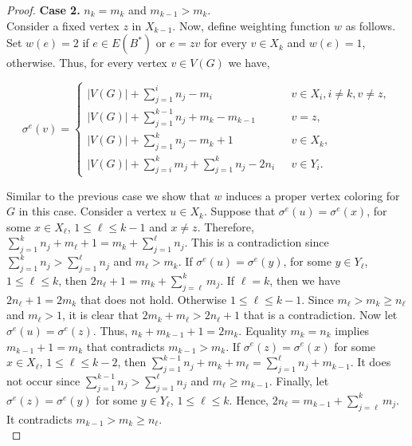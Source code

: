 \documentclass[12pt,a4paper]{article}
\begin{document}
\begin{proof}
	\textbf{Case 2.} $n_k = m_k$ and $m_{k-1}>m_k.$\\
	Consider a fixed vertex $z$ in $X_{k-1}$.  Now, define weighting function $w$ as follows. Set $w(e)=2$ if $e\in E(B^*)$ or $e=zv$ for every $v\in X_k$ and $w(e)=1$, otherwise. Thus, for every vertex $ v\in V(G) $ we have,
	\begin{center}
		\begin{equation}\label{1}
		\sigma^{e}(v)=
		\left\{
		\begin{array}{ll}
		|V(G)|+\sum _{j=1}^i n_j-m_i & \ \ \ v\in X_i, i\neq k, v\neq z,  \\
		|V(G)|+\sum _{j=1}^{k-1} n_j +m_{k}-m_{k-1} & \ \ \ v=z,\\
		|V(G)|+\sum _{j=1}^{k} n_j -m_{k}+1 & \ \ \ v\in X_k, \\
		|V(G)|+\sum _{j=i}^k m_j + \sum_{j=1}^k n_j-2n_i & \ \ \ v\in Y_i.
		\end{array}
		\right.
		\end{equation}
	\end{center}
	Similar to the previous case we show that $w$ induces a proper vertex coloring for $G$ in this case. Consider a vertex $u \in X_k$. Suppose that $\sigma^{e}(u)=\sigma^{e}(x)$, for some  $x\in X_{\ell}$, $1\leq \ell \leq k-1 $ and $x \neq z$. Therefore, $\sum _{j=1}^{k} n_j + m_{\ell}+1=m_k +\sum _{j=1}^{\ell} n_j$. This is a contradiction since $\sum _{j=1}^{k} n_j >\sum _{j=1}^{\ell} n_j$ and $m_{\ell} > m_k$.
	If $\sigma^{e}(u)=\sigma^{e}(y)$, for some  $y \in Y_{\ell}$, $1\leq \ell \leq k $, then $2n_{\ell}+1=m_k + \sum _{j=\ell}^k m_j.$
	If $\ell =k$, then  we have $2n_{\ell}+1=2m_k$ that does not hold. Otherwise $1\leq \ell \leq k-1$. Since $m_{\ell}> m_k \geq n_{\ell}$ and $m_{\ell} >1$,  it is clear that $2m_k +m_{\ell} >2n_{\ell}+1$ that is a contradiction.
	Now let $\sigma^{e}(u)=\sigma^{e}(z)$. Thus, $n_k +m_{k-1}+1=2m_{k}.$
	Equality $m_k=n_k$ implies $m_{k-1}+1=m_{k}$ that contradicts  $m_{k-1}> m_{k}$.
	If $\sigma^{e}(z)=\sigma^{e}(x)$ for some  $x\in X_{\ell}$, $1\leq \ell \leq k-2 $, then
	$\sum _{j=1}^{k-1} n_j +m_k+m_{\ell}=\sum _{j=1}^{\ell} n_j+m_{k-1}$. It does not occur since $\sum _{j=1}^{k-1} n_j >\sum _{j=1}^{\ell} n_j$ and $m_{\ell} \geq m_{k-1}$.
	Finally, let $\sigma^{e}(z)=\sigma^{e}(y)$ for some  $y\in Y_{\ell}$, $1\leq \ell \leq k $. Hence, $2n_{\ell}=m_{k-1}+\sum _{j=\ell}^k m_j $. It contradicts $m_{k-1} >m_k \geq n_{\ell}$.\\
	

\end{proof}
\end{document}
